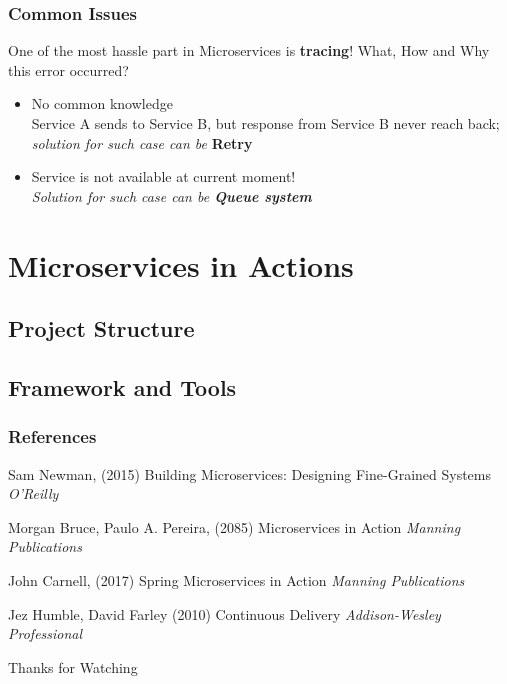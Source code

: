 \documentclass{beamer}
\begin{document}
	\begin{frame}
		\frametitle{Common Issues}
		One of the most hassle part in Microservices is \textbf{tracing}! What, How and Why this error occurred? 
		\begin{itemize}
			\item No common knowledge \\
			Service A sends to Service B, but response from Service B never reach back; \textit{solution for such case can be} \textbf{Retry}
			\item Service is not available at current moment! \\
			\textit{Solution for such case can be \textbf{Queue system}}
		\end{itemize}
		\vspace{100mm}
	\end{frame}
	
		


\section{Microservices in Actions}
	\subsection {Project Structure}
	\subsection {Framework and Tools}
	
	
\begin{frame}
\frametitle{References}
\footnotesize{
\begin{thebibliography}{99} %
 Sam Newman, (2015)
\newblock Building Microservices: Designing Fine-Grained Systems
\newblock \emph{O'Reilly}

 Morgan Bruce, Paulo A. Pereira, (2085)
\newblock Microservices in Action
\newblock \emph{Manning Publications}

 John Carnell, (2017)
\newblock Spring Microservices in Action
\newblock \emph{Manning Publications}

 Jez Humble, David Farley (2010)
\newblock Continuous Delivery
\newblock \emph{Addison-Wesley Professional}
\end{thebibliography}
}
\end{frame}


\begin{frame}
\Huge{\centerline{Thanks for Watching}}
\end{frame}

\end{document}
